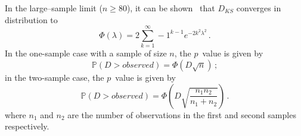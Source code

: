 \documentclass[codesnippet]{jss}
\begin{document}

In the large--sample limit ($n \geq 80$), it can be shown~\citep{Kendall1946} that $D_{KS}$ converges in distribution to
\begin{equation} \label{eq:1}
\Phi(\lambda) = 2 \sum_{k=1}^{\infty} -1^{k-1}e^{-2k^2\lambda^2} \,.
\end{equation}
%
In the one-sample case with a sample of size $n$, the $p$~value is given by
\begin{equation} \label{eq:2}
\mathbb{P}(D > observed) = \Phi ( D\sqrt{n})\,;
\end{equation}
in the two-sample case, the $p$~value is given by
%
\begin{equation} \label{eq:3}
\mathbb{P}(D > observed) = \Phi \left( D\sqrt{\frac{n_1n_2}{n_1+n_2}} \right)\,.
\end{equation}
%
where $n_1$ and $n_2$ are the number of observations in the first and second samples respectively.
\end{document}
